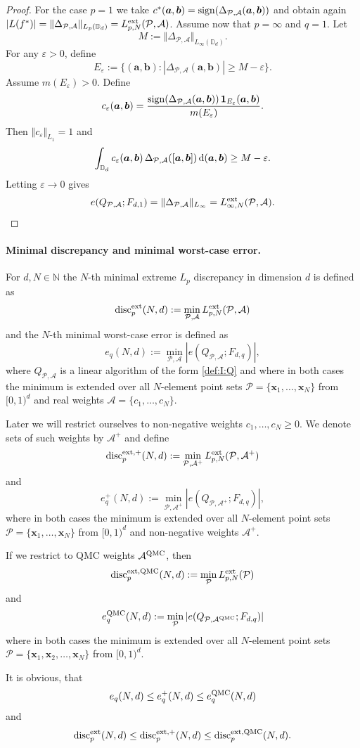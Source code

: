 \documentclass[12pt]{article}
\theoremstyle{remark}
\theoremstyle{definition}
\newcommand{\N}{\mathbb{N}}
\newcommand{\D}{\mathbb{D}}
\newcommand{\sgn}{{\rm sign}}
\newcommand{\ex}{{\rm ext}}
\newcommand{\qmc}{{\rm QMC}}
\newcommand{\rd}{\,{\rm d}}
\newcommand{\bsx}{{\boldsymbol x}}
\newcommand{\bsa}{{\boldsymbol a}}
\newcommand{\bsb}{{\boldsymbol b}}
\newcommand{\cP}{\mathcal{P}}
\newcommand{\cA}{\mathcal{A}}
\newcommand{\<}{\langle}
\renewcommand{\>}{\rangle}
\begin{document}
\begin{proof}
For the case $p=1$ we take $c^*(\bsa,\bsb) = \sgn (\Delta_{\cP,\cA} (\bsa,\bsb))$ and obtain 
again $|L(f^\ast)|=\|\Delta_{\cP,\cA}\|_{L_p(\D_d)}=L_{p,N}^{\ex}(\cP,\cA)$.
Assume now that  $p=\infty$ and  $q=1$. Let
\[
M:=\Vert \Delta_{\cP,\cA} \Vert_{L_{\infty}(\D_d)}.
\]
For any $\varepsilon>0$, define
\[
E_\varepsilon
:=\{(\bsa,\bsb): |\Delta_{\cP,\cA}(\bsa,\bsb)| \ge M-\varepsilon\}.
\]
Assume $m(E_\varepsilon)>0$.
Define
\[
c_\varepsilon (\bsa, \bsb) 
=\frac{ \sgn (\Delta_{\cP,\cA} (\bsa, \bsb) )\,  {\mathbf 1}_{E_\varepsilon} (\bsa, \bsb) }{m(E_\varepsilon)}.
\]
Then $\Vert c_\varepsilon\Vert_{L_1}=1$ and
\[
\int_{\D_d}  c_\varepsilon (\bsa,\bsb)\,\Delta_{\cP,\cA}([\bsa,\bsb])\rd (\bsa,\bsb )
\ge M-\varepsilon.
\]
Letting $\varepsilon\to0$ gives
\[
e(Q_{\cP,\cA};F_{d,1})
=\Vert  \Delta_{\cP,\cA}\Vert_{L_\infty}=L_{\infty,N}^{\ex}(\cP,\cA).
\]
\end{proof}

\paragraph{Minimal discrepancy and minimal worst-case error.}

For $d,N \in \N$ the $N$-th minimal extreme $L_p$ discrepancy in dimension $d$ is defined as $${\rm disc}_p^{\ex}(N,d):=\min_{\cP,\cA} L_{p,N}^{\ex}(\cP,\cA)$$ and the $N$-th minimal worst-case error is defined as $$e_q(N,d):=\min_{\cP,\cA} |e(Q_{\cP,\cA};F_{d,q})|,$$
where  $Q_{\cP,\cA}$ is a linear algorithm of the form \eqref{def:I:Q} and where in both cases the 
minimum is extended over all $N$-element point sets $\cP =\{\bsx_1,\ldots,\bsx_N\}$ from $[0,1)^d$ and real weights $\cA=\{c_1,\ldots,c_N\}$. 

Later we will restrict ourselves to non-negative weights $c_1,\ldots,c_N \ge 0$. We denote sets of such weights by $\cA^+$ and define
$${\rm disc}_p^{\ex,+}(N,d):=\min_{\cP,\cA^+} L_{p,N}^{\ex}(\cP,\cA^+)$$ and $$e_q^+(N,d):=\min_{\cP,\cA^+} |e(Q_{\cP,\cA^+};F_{d,q})|,$$
where in both cases the minimum is extended over all $N$-element point sets $\cP =\{\bsx_1,\ldots,\bsx_N\}$ from $[0,1)^d$ and non-negative weights $\cA^+$.

If we restrict to QMC weights $\cA^{\qmc}$, then $${\rm disc}_p^{\ex,\qmc}(N,d):=\min_{\cP} L_{p,N}^{\ex}(\cP)$$ and
$$e_q^{\qmc}(N,d):=\min_{\cP} |e(Q_{\cP,\cA^{\qmc}};F_{d,q})|$$ where in both cases the minimum is extended over all $N$-element point sets $\cP =\{\bsx_1,\bsx_2,\ldots,\bsx_N\}$ from $[0,1)^d$.

It is obvious, that $$e_q(N,d) \le e_q^+(N,d) \le e_q^{\qmc}(N,d)$$ and $${\rm disc}_p^{\ex}(N,d) \le {\rm disc}_p^{\ex,+}(N,d) \le {\rm disc}_p^{\ex,\qmc}(N,d).$$
\end{document}
